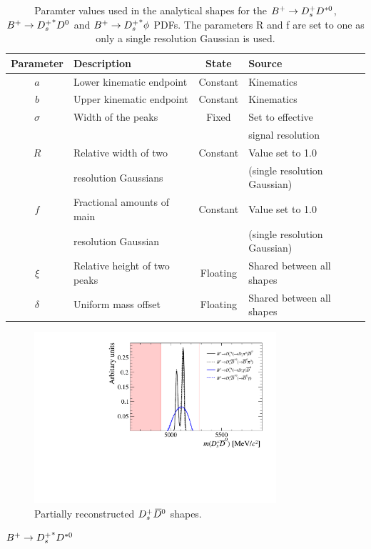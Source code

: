 {%
\begin{table}[h]
\centering
\caption{Paramter values used in the analytical shapes for the ${B}^+ \rightarrow {\ensuremath{{D}^+_{s}}} D^{*0}$, ${B}^+ \rightarrow {\ensuremath{{D}^+_{s}}}^{*} D^{0}$ and ${B}^+ \rightarrow {\ensuremath{{D}^+_{s}}}^{*} \phi$ PDFs. The parameters R and f are set to one as only a single resolution Gaussian is used.} 
\label{tab:DDstar_paramters} 
\begin{tabular}{ c l c l }
\hline
Parameter & Description & State & Source \\
\hline
$a$         & Lower kinematic endpoint     & Constant & Kinematics                  \\
$b$         & Upper kinematic endpoint     & Constant & Kinematics                  \\ 
$\sigma$    & Width of the peaks           & Fixed    & Set to effective            \\ 
            &                              &          & signal resolution           \\  
$R$         & Relative width of two        & Constant & Value set to 1.0            \\
            & resolution Gaussians         &          & (single resolution Gaussian)\\  
$f$         & Fractional amounts of main   & Constant & Value set to 1.0            \\
            & resolution Gaussian          &          &(single resolution Gaussian) \\ 
$\xi$       & Relative height of two peaks & Floating & Shared between all shapes   \\
$\delta$    & Uniform mass offset          & Floating & Shared between all shapes   \\
\hline
\end{tabular}
\end{table}



\begin{figure}[!h]
    \centering
    \includegraphics[width=0.80\textwidth]{figs/B2DsPhi/DsD0_part_reco_Shapes.pdf}
    \caption{Partially reconstructed ${{D}^+_{s}}{{\kern 0.2em\overline{\kern -0.2em D}{}}{}^0}$ shapes.}
    \label{fig:B2DsPhi_DsD0_partreco}   
\end{figure}
${B}^+ \rightarrow {\ensuremath{{D}^+_{s}}}^{*} D^{*0}$


}
